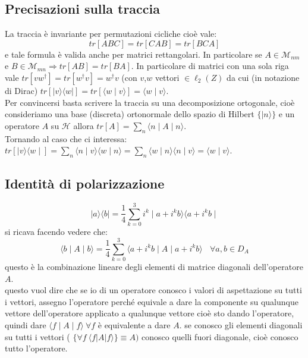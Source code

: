 \subsection{Precisazioni sulla traccia} %
La traccia è invariante per permutazioni cicliche cioè vale: $$tr[ABC]=tr[CAB]=tr[BCA]$$ e tale formula è valida anche per matrici rettangolari. In particolare se $A \in \mathcal{M}_{nm}$ e $B \in \mathcal{M}_{mn} \Rightarrow tr[AB]=tr[BA]$. In particolare di matrici con una sola riga vale $tr[vw^{\dag}] = tr[w^{\dag}v] = w^{\dag}v$ (con $v$,$w$ vettori $\in \ell_2(Z)$ da cui (in notazione di Dirac) $tr[ \vert v \rangle \langle w \vert]=tr[\langle w \mid v \rangle]= \langle w \mid v \rangle$. \\
Per convincersi basta scrivere la traccia su una decomposizione ortogonale, cioè consideriamo una base (discreta) ortonormale dello spazio di Hilbert $\lbrace \mid n \rangle \rbrace$ e un operatore $A$ su $\mathcal{H}$ allora $tr[A]= \sum_{n} \langle n \mid A \mid n \rangle $. \\ Tornando al caso che ci interessa: \\ 
$tr[ \mid v \rangle \langle w \mid] = \sum_{n} \langle n \mid v \rangle \langle w \mid n \rangle = \sum_{n} \langle w \mid n \rangle \langle n \mid v \rangle = \langle w \mid v \rangle$.

\subsection{Identità di polarizzazione} %
$$
\mid a \rangle \langle b \mid = \dfrac{1}{4} \sum_{k=0}^{3} i^{k} \mid a+i^{k}b \rangle \langle a + i^{k}b \mid
$$ 
si ricava facendo vedere che:
$$
\langle b \mid A \mid b \rangle = \frac{1}{4} \sum_{k=0}^{3} \langle a + i^{k}b \mid A \mid a+i^{k}b \rangle \ \ \ \ \forall a,b \in D_{A}
$$
questo è la combinazione lineare degli elementi di matrice diagonali dell'operatore $A$.\\
questo vuol dire che se io di un operatore conosco i valori di aspettazione su tutti i vettori, assegno l'operatore perché equivale a dare la componente su qualunque vettore dell'operatore applicato a qualunque vettore cioè sto dando l'operatore, quindi dare $\langle f \mid A \mid f \rangle \ \forall f$ è equivalente a dare $A$. se conosco gli elementi diagonali su tutti i vettori ( $\lbrace \forall f \ \langle f \vert A \vert f \rangle \rbrace \equiv A )$ conosco quelli fuori diagonale, cioè conosco tutto l'operatore.

